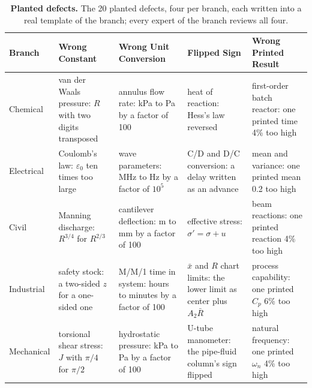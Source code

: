 \begin{table}[t]
    \centering
    \small
    \renewcommand{\arraystretch}{1.1}
    \setlength{\tabcolsep}{4pt}
    \begin{tabular}{l p{} p{} p{} p{}}
        \toprule
        \rowcolor{gray!10}
        \textbf{Branch} & \textbf{Wrong Constant} & \textbf{Wrong Unit Conversion} &
        \textbf{Flipped Sign} & \textbf{Wrong Printed Result} \\
        \midrule
        Chemical & van der Waals pressure: $R$ with two digits transposed & annulus flow rate: kPa to Pa by a factor of 100 & heat of reaction: Hess's law reversed & first-order batch reactor: one printed time 4\% too high \\
        Electrical & Coulomb's law: $\varepsilon_0$ ten times too large & wave parameters: MHz to Hz by a factor of $10^5$ & C/D and D/C conversion: a delay written as an advance & mean and variance: one printed mean 0.2 too high \\
        Civil & Manning discharge: $R^{3/4}$ for $R^{2/3}$ & cantilever deflection: m to mm by a factor of 100 & effective stress: $\sigma' = \sigma + u$ & beam reactions: one printed reaction 4\% too high \\
        Industrial & safety stock: a two-sided $z$ for a one-sided one & M/M/1 time in system: hours to minutes by a factor of 100 & $\bar{x}$ and $R$ chart limits: the lower limit as center plus $A_2\bar{R}$ & process capability: one printed $C_p$ 6\% too high \\
        Mechanical & torsional shear stress: $J$ with $\pi/4$ for $\pi/2$ & hydrostatic pressure: kPa to Pa by a factor of 100 & U-tube manometer: the pipe-fluid column's sign flipped & natural frequency: one printed $\omega_n$ 4\% too high \\
        \bottomrule
    \end{tabular}
    \caption{\textbf{Planted defects.} The 20 planted defects, four per branch, each written into a
    real template of the branch; every expert of the branch reviews all four.}
    \label{tab:planted_defects}
\end{table}

